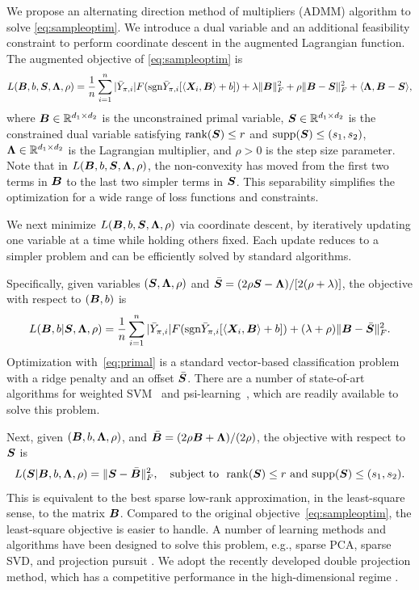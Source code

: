 \documentclass[aos]{imsart}
\theoremstyle{definition}
\def\sign{\textup{sgn}}
\def\rank{\textup{rank}}
\begin{document}
We propose an alternating direction method of multipliers (ADMM) algorithm to solve \eqref{eq:sampleoptim}. We introduce a dual variable and an additional feasibility constraint to perform coordinate descent in the augmented Lagrangian function. The augmented objective of \eqref{eq:sampleoptim} is
\begin{equation*} \label{eq:ADMM}
L(\mB,b, \mS,\mLambda,\rho) = {1\over n}\sum_{i=1}^n|\bar Y_{\pi, i}|F(\sign \bar Y_{\pi, i}[\langle \mX_i,\mB \rangle+b])  + \lambda\FnormSize{}{\mB}^2+\rho\FnormSize{}{\mB-\mS}^2+\langle \mLambda, \mB-\mS\rangle,
\end{equation*}
where $\bm B\in \mathbb{R}^{d_1\times d_2}$ is the unconstrained primal variable, $\bm S\in\mathbb{R}^{d_1\times d_2}$ is the constrained dual variable satisfying $\rank(\mS)\leq r$ and $\text{supp}(\bm S)\leq (s_1,s_2)$, $\bm{\Lambda}\in\mathbb{R}^{d_1\times d_2}$ is the Lagrangian multiplier, and $\rho>0$ is the step size parameter. Note that in $L(\bm B,b, \bm S,\bm{\Lambda},\rho)$, the non-convexity has moved from the first two terms in $\bm B$ to the last two simpler terms in $\bm S$. This separability simplifies the optimization for a wide range of loss functions and constraints. 

We next minimize $L(\bm B,b, \bm S,\bm{\Lambda},\rho)$ via coordinate descent, by iteratively updating one variable at a time while holding others fixed. Each update reduces to a simpler problem and can be efficiently solved by standard algorithms. 

Specifically, given variables $(\bm S,\bm{\Lambda},\rho)$ and $\bar {\bm S} = (2\rho\bm S-\bm{\Lambda}) / [2(\rho+\lambda)]$, the objective with respect to $(\bm B,b)$ is 
\begin{equation*} \label{eq:primal}
L(\mB,b|\mS,\mLambda,\rho)={1\over n}\sum_{i=1}^n |\bar Y_{\pi, i}| F(\sign \bar Y_{\pi, i}[\langle \mX_i,\mB \rangle+b]) +(\lambda+\rho)\FnormSize{}{\mB-\bar \mS}^2.
\end{equation*}
Optimization with~\eqref{eq:primal} is a standard vector-based classification problem with a ridge penalty and an offset $\bar {\bm S}$. There are a number of state-of-art algorithms for weighted SVM~\cite{wang2008probability} and psi-learning~\cite{shen2003psi}, which are readily available to solve this problem.  

Next, given $(\bm B,b,\bm{\Lambda},\rho)$, and $\bar {\bm B}=(2\rho\bm B+\bm{\Lambda}) / (2\rho)$, the objective with respect to $\bm S$ is
\begin{equation}\label{eq:dual}
L(\mS|\mB,b,\mLambda,\rho)=\FnormSize{}{\mS-\bar \mB}^2,\quad \text{subject to} ~~ \rank(\mS)\leq r \text{ and }\text{supp}(\mS)\leq (s_1,s_2).
\end{equation}
This is equivalent to the best sparse low-rank approximation, in the least-square sense, to the matrix $\bm B$. Compared to the original objective~\eqref{eq:sampleoptim}, the least-square objective is easier to handle. A number of learning methods and algorithms have been designed to solve this problem, e.g., sparse PCA, sparse SVD, and projection pursuit \citep{Ma2013}. We adopt the recently developed double projection method, which has a competitive performance in the high-dimensional regime \cite{yang2016rate}. 
\end{document}
